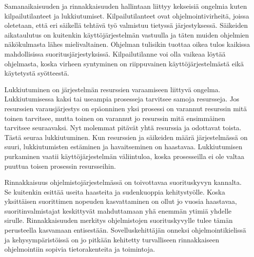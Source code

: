 \documentclass[a4paper, 12pt]{article}
\begin{document}

Samanaikaisuuden ja rinnakkaisuuden hallintaan liittyy kekseisiä ongelmia
kuten kilpailutilanteet ja lukkiutumiset.
Kilpailutilanteet ovat ohjelmointivirheitä,
joissa oletetaan, että eri säikellä tehtävä työ
valmistuu tietyssä järjestyksessä. Säikeiden
aikataulutus on kuitenkin käyttöjärjestelmän vastuulla
ja täten muiden ohjelmien näkökulmasta lähes mielivaltainen.
Ohjelman tulisikin tuottaa oikea tulos
kaikissa mahdollisissa suoritusjärjestyksissä.
Kilpailutilanne voi olla vaikeaa löytää
ohjelmasta, koska virheen syntyminen
on riippuvainen käyttöjärjestelmästä eikä käytetystä syötteestä.


Lukkiutuminen on järjestelmän resurssien varaamiseen liittyvä
ongelma. Lukkiutumisessa kaksi tai useampia prosesseja
tarvitsee samoja resursseja. Jos resurssien varausjärjestys
on epäonninen yksi prosessi on varannut resurssin mitä toinen
tarvitsee, mutta toinen on varannut jo resurssin mitä ensimmäinen
tarvitsee seuraavaksi. Nyt molemmat pitävät yhtä resurssia ja odottavat toista.
Tästä seuraa lukkiutuminen. Kun resurssien ja 
säikeiden määrä järjestelmässä on suuri, 
lukkiutumisten estäminen ja havaitseminen
on haastavaa.
Lukkiutumisen purkaminen vaatii käyttöjärjestelmän väliintuloa,
koska prosesseilla ei ole valtaa puuttua toisen prosessin resursseihin.

Rinnakkaisuus ohjelmistojärjestelmässä on 
toivottavaa suorituskyvyn kannalta.
Se kuitenkin esittää useita haasteita
ja sudenkuoppia kehitystyölle.
Koska yksittäisen suorittimen nopeuden kasvattaminen
on ollut jo vuosia
haastavaa, suoritinvalmistajat keskittyvät mahduttamaan
yhä enemmän ytimiä yhdelle sirulle. Rinnakkaisuuden merkitys
ohjelmistojen suorituskyvylle tulee tämän perusteella kasvamaan entisestään.
Sovelluskehittäjän onneksi ohjelmointikielissä ja kehysympäristöissä
on jo pitkään kehitetty turvalliseen rinnakkaiseen ohjelmointiin
sopivia tietorakenteita ja toimintoja.
\end{document}
